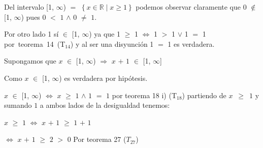 \documentclass[12pt]{article}
\begin{document}
Del intervalo [1, $\infty$) $=$ $\left\{ x \in \mathbb{R} \mid x \geq 1 \right\}$ podemos observar claramente que $0$ $\notin$ [1, $\infty$) pues $0$ $<$ $1$ \hspace{0.2cm} $\wedge$ \hspace{0.2cm} $0$ $\neq$ $1$. \vspace{0.2cm}

Por otro lado 1 sí $\in$ [1, $\infty$) ya que \hspace{0.2cm} 1 $\geq$ 1 \hspace{0.2cm} $\Longleftrightarrow$ \hspace{0.2cm} 1 $>$ 1 \hspace{0.2cm} $\vee$ \hspace{0.2cm} 1 $=$ 1 \mbox{{\textcolor{carrotorange}{por teorema 14 (T$_{14}$)}}} y al ser una disyunción 1 $=$ 1 es verdadera. \vspace{0.5cm}

Supongamos que $x$ $\in$ [1, $\infty$) \hspace{0.2cm} $\Longrightarrow$ \hspace{0.2cm} $x$ $+$ $1$ $\in$ [1, $\infty$] \vspace{0.5cm} 

Como $x$ $\in$ [1, $\infty$) es verdadera por hipótesis. \vspace{0.5cm}

$x$ $\in$ [1, $\infty$) \hspace{0.2cm} $\Longleftrightarrow$ \hspace{0.2cm} $x$ $\geq$ $1$ \hspace{0.2cm} $\wedge$ \hspace{0.2cm} $1$ $=$ $1$ {\textcolor{carrotorange}{por teorema 18 i) (T$_{18}$)}} partiendo de \mbox{$x$ $\geq$ $1$} y sumando $1$ a ambos lados de la desigualdad tenemos: \vspace{0.5cm}

\hspace{4cm} $x$ $\geq$ $1$  \hspace{0.2cm} $\Longleftrightarrow$  \hspace{0.2cm} $x$ $+$ $1$ $\geq$ $1$ $+$ $1$ \vspace{0.5cm}

\hspace{5.8cm} $\Longleftrightarrow$  \hspace{0.2cm} $x$ $+$ $1$ $\geq$ $2$ $>$ $0$ \hspace{0.5cm} {\textcolor{carrotorange}{Por teorema 27 ($T_{27}$)}}     \vspace{0.5cm} 
\end{document}
